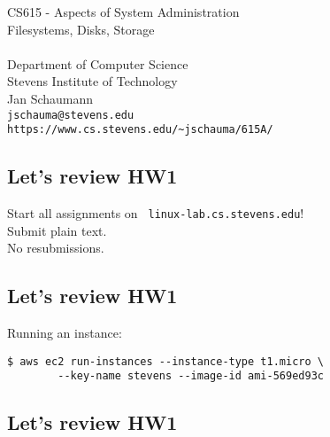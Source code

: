 \documentclass[xga]{xdvislides}
\begin{document}
\setfontphv

\lhead{\slidetitle}				%
\cfoot{\relax}					%
\rfoot{\Gray{\today}}

\vspace*{\fill}
\begin{center}
	\Hugesize
		CS615 - Aspects of System Administration\\ [1em]
		Filesystems, Disks, Storage\\ [1em]
	\hspace*{5mm}\blueline\\ [1em]
	\Normalsize
		Department of Computer Science\\
		Stevens Institute of Technology\\
		Jan Schaumann\\
		\verb+jschauma@stevens.edu+ \\
		\verb+https://www.cs.stevens.edu/~jschauma/615A/+
\end{center}
\vspace*{\fill}

\subsection{Let's review HW1}
\vspace{.5in}
Start all assignments on {\tt
linux-lab.cs.stevens.edu}! \\
\vspace{.5in}
Submit plain text. \\
\vspace{.5in}
No resubmissions.

\subsection{Let's review HW1}
\vspace{.5in}

Running an instance:
\begin{verbatim}
$ aws ec2 run-instances --instance-type t1.micro \
        --key-name stevens --image-id ami-569ed93c
\end{verbatim}

\subsection{Let's review HW1}
\vspace{.5in}
\end{document}
